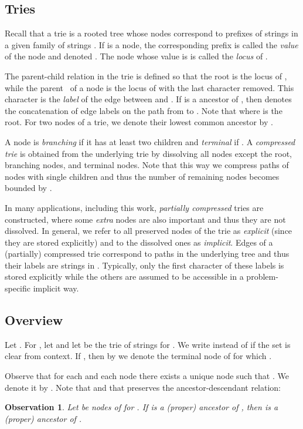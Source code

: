 \documentclass[a4paper]{article}
\newtheorem{observation}[theorem]{Observation}
\theoremstyle{remark}
\begin{document}
\subsection{Tries}
Recall that a trie is a rooted tree whose nodes correspond to prefixes of strings in a given family of strings .
If  is a node, the corresponding prefix is called the \emph{value} of the node and denoted .
The node  whose value is  is called the \emph{locus} of .

The parent-child relation in the trie is defined so that the root is the locus of ,
while the parent~ of a node  is the locus of  with the last character removed.
This character is the \emph{label} of the edge between  and .
If  is a ancestor of , then  denotes the concatenation
of edge labels on the path from  to . Note that  where  is the root.
For two nodes  of a trie, we denote their lowest common ancestor by .

A node  is \emph{branching} if it has at least two children and \emph{terminal} if .
A \emph{compressed trie} is obtained from the underlying trie by dissolving all nodes except
the root, branching nodes, and terminal nodes. Note that this way we compress paths of nodes with single children
and thus the number of remaining nodes becomes bounded by .

In many applications, including this work, \emph{partially compressed} tries are constructed,
where some \emph{extra} nodes are also important and thus they are not dissolved.
In general, we refer to all preserved nodes of the trie as \emph{explicit} (since they are stored explicitly)
and to the dissolved ones as \emph{implicit}.
Edges of a (partially) compressed trie correspond to paths in the underlying tree
and thus their labels are strings in . Typically, only the first character of these labels is stored explicitly
while the others are assumed to be accessible in a problem-specific implicit way.

\subsection{Overview}
Let . For , let 
and let  be the trie of strings  for .
We write  instead of  if the set  is clear from context.
If , then by  we denote the terminal node  of  for which
.

Observe that for each  and each node  there exists a unique node 
such that . We denote it by .
Note that  and that  preserves the ancestor-descendant relation:

\begin{observation}\label{obs:link}
Let  be nodes of  for . If  is a (proper) ancestor of , then 
is a (proper) ancestor of .
\end{observation}
\end{document}
